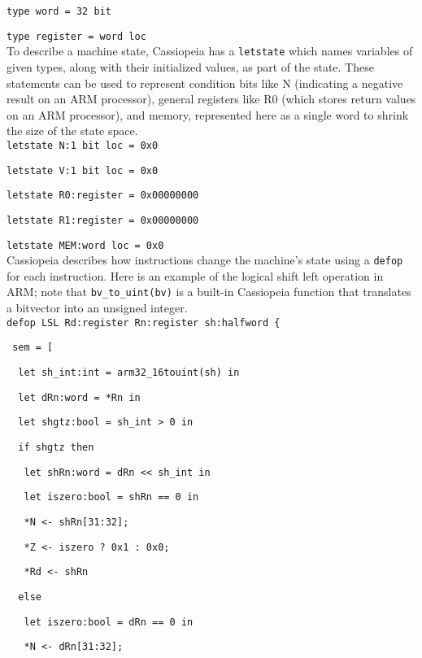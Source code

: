 \documentclass[letterpaper,12pt]{article}
\begin{document}
\texttt{type word = 32 bit}

\texttt{type register = word loc}\\

To describe a machine state, Cassiopeia has a \texttt{letstate} which names variables of given types, along with their initialized values, as part of the state. These statements can be used to represent condition bits like N (indicating a negative result on an ARM processor), general registers like R0 (which stores return values on an ARM processor), and memory, represented here as a single word to shrink the size of the state space.\\

\texttt{letstate N:1 bit loc = 0x0}

\texttt{letstate V:1 bit loc = 0x0}

\texttt{letstate R0:register = 0x00000000}

\texttt{letstate R1:register = 0x00000000}

\texttt{letstate MEM:word loc = 0x0}\\

Cassiopeia describes how instructions change the machine's state using a \texttt{defop} for each instruction.  Here is an example of the logical shift left operation in ARM; note that \texttt{bv\_to\_uint(bv)} is a built-in Cassiopeia function that translates a bitvector into an unsigned integer.\\
        
\texttt{defop LSL Rd:register Rn:register sh:halfword \{}

\texttt{\ sem = [}

\texttt{\ \ let sh\_int:int = arm32\_16touint(sh) in}

\texttt{\ \ let dRn:word = *Rn in}

\texttt{\ \ let shgtz:bool = sh\_int > 0 in}

\texttt{\ \ if shgtz then}

\texttt{\ \ \ let shRn:word = dRn << sh\_int in}

\texttt{\ \ \ let iszero:bool = shRn == 0 in}

\texttt{\ \ \ *N <- shRn[31:32];}

\texttt{\ \ \ *Z <- iszero ? 0x1 : 0x0;}

\texttt{\ \ \ *Rd <- shRn}

\texttt{\ \ else}

\texttt{\ \ \ let iszero:bool = dRn == 0 in}

\texttt{\ \ \ *N <- dRn[31:32];}
\end{document}
